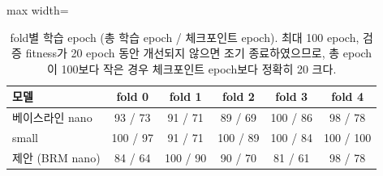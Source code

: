 \begin{table}[htbp]
\centering
\small
\caption[fold별 학습 epoch (총 학습 epoch / 체크포인트 epoch).]{fold별 학습 epoch (총 학습 epoch / 체크포인트 epoch). 최대 100 epoch, 검증 fitness가 20 epoch 동안 개선되지 않으면 조기 종료하였으므로, 총 epoch이 100보다 작은 경우 체크포인트 epoch보다 정확히 20 크다.}
\label{tab:epochs}
\begin{adjustbox}{max width=\linewidth}
\begin{tabular}{lccccc}
\toprule
모델 & fold 0 & fold 1 & fold 2 & fold 3 & fold 4 \\
\midrule
베이스라인 nano & 93 / 73 & 91 / 71 & 89 / 69 & 100 / 86 & 98 / 78 \\
small & 100 / 97 & 91 / 71 & 100 / 89 & 100 / 84 & 100 / 100 \\
제안 (BRM nano) & 84 / 64 & 100 / 90 & 90 / 70 & 81 / 61 & 98 / 78 \\
\bottomrule
\end{tabular}
\end{adjustbox}
\end{table}
